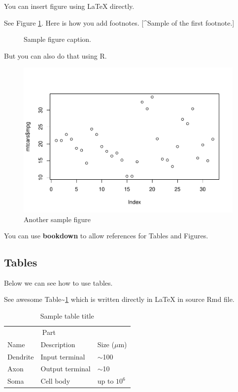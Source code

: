 \documentclass{article}
\begin{document}
You can insert figure using LaTeX directly.

See Figure \ref{fig:fig1}. Here is how you add footnotes. {[}\^{}Sample
of the first footnote.{]}

\begin{figure}
  \centering
  \fbox{\rule[-.5cm]{4cm}{4cm} \rule[-.5cm]{4cm}{0cm}}
  \caption{Sample figure caption.}
  \label{fig:fig1}
\end{figure}

But you can also do that using R.

\begin{figure}

{\centering \includegraphics{assessing-the-role-of-dopamine-on-the-formation-of-contextually-relevant-visual-routines_files/figure-latex/fig2-1} 

}

\caption{Another sample figure}\label{fig:fig2}
\end{figure}

You can use \textbf{bookdown} to allow references for Tables and
Figures.

\hypertarget{tables}{%
\subsection{Tables}\label{tables}}

Below we can see how to use tables.

See awesome Table\textasciitilde{}\ref{tab:table} which is written
directly in LaTeX in source Rmd file.

\begin{table}
 \caption{Sample table title}
  \centering
  \begin{tabular}{lll}
    \toprule
    \multicolumn{2}{c}{Part}                   \\
    \cmidrule(r){1-2}
    Name     & Description     & Size ($\mu$m) \\
    \midrule
    Dendrite & Input terminal  & $\sim$100     \\
    Axon     & Output terminal & $\sim$10      \\
    Soma     & Cell body       & up to $10^6$  \\
    \bottomrule
  \end{tabular}
  \label{tab:table}
\end{table}
\end{document}
